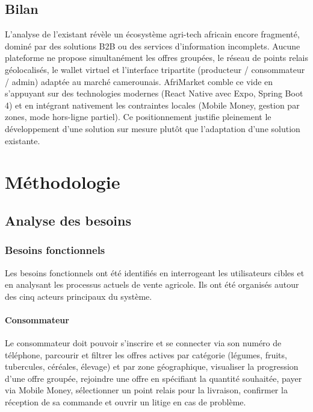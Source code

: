 \documentclass[12pt, a4paper, oneside]{report}
\begin{document}
\section{Bilan}

L'analyse de l'existant révèle un écosystème agri-tech africain encore fragmenté, dominé
par des solutions B2B ou des services d'information incomplets. Aucune plateforme ne
propose simultanément les offres groupées, le réseau de points relais géolocalisés, le
wallet virtuel et l'interface tripartite (producteur / consommateur / admin) adaptée au
marché camerounais. AfriMarket comble ce vide en s'appuyant sur des technologies modernes
(React Native avec Expo, Spring Boot 4) et en intégrant nativement les contraintes locales
(Mobile Money, gestion par zones, mode hors-ligne partiel). Ce positionnement justifie
pleinement le développement d'une solution sur mesure plutôt que l'adaptation d'une
solution existante.

\chapter{Méthodologie}

\section{Analyse des besoins}

\subsection{Besoins fonctionnels}

Les besoins fonctionnels ont été identifiés en interrogeant les utilisateurs cibles et en
analysant les processus actuels de vente agricole. Ils ont été organisés autour des
cinq acteurs principaux du système.

\subsubsection{Consommateur}

Le consommateur doit pouvoir s'inscrire et se connecter via son numéro de téléphone, parcourir
et filtrer les offres actives par catégorie (légumes, fruits, tubercules, céréales,
élevage) et par zone géographique, visualiser la progression d'une offre groupée, rejoindre
une offre en spécifiant la quantité souhaitée, payer via Mobile Money, sélectionner un
point relais pour la livraison, confirmer la réception de sa commande et ouvrir un litige
en cas de problème.
\end{document}
